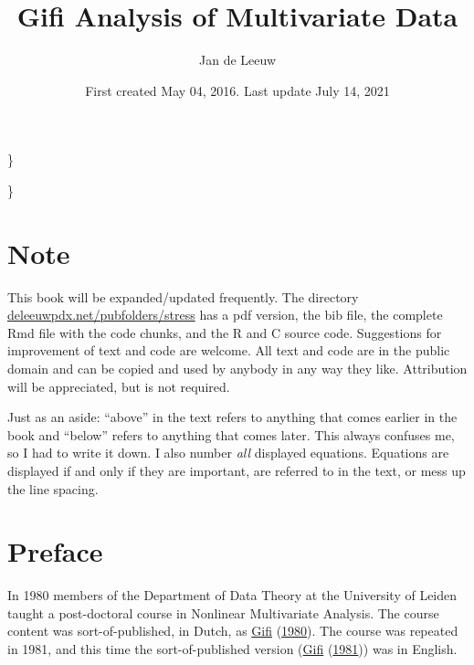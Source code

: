\documentclass[
  12pt,
]{book}
\title{Gifi Analysis of Multivariate Data}
\author{Jan de Leeuw}
\date{First created May 04, 2016. Last update July 14, 2021}
\begin{document}
\maketitle

{
\setcounter{tocdepth}{3}
\tableofcontents
}
\newcommand{\ul}[1]{\underline{#1}}
\newcommand{\ol}[1]{\overline{#1}}
\newcommand{\bb}[1]{\mathbb{#1}}
\newcommand{\mc}[1]{\mathcal{#1}}
\newcommand{\df}{=:}
\newcommand{\am}[1]{\mathop{\text{argmin}}_{#1}}

\}

\newcommand{\ls}[2]{\mathop{\sum\sum}_{#1}^{#2}}

\}
\newcommand{\ijs}{\mathop{\sum\sum}_{1\leq i<j\leq n}}
\newcommand{\jis}{\mathop{\sum\sum}_{1\leq j<i\leq n}}
\newcommand{\sij}{\sum_{i=1}^n\sum_{j=1}^n}

\newcommand{\argmin}[1]{\mathop{\mathbf{argmin}}\limits_{#1}}
\newcommand{\argmax}[1]{\mathop{\mathbf{argmax}}\limits_{#1}}

\hypertarget{note}{%
\chapter*{Note}\label{note}}

This book will be expanded/updated frequently. The directory \href{http://deleeuwpdx.net/pubfolders/stress}{deleeuwpdx.net/pubfolders/stress} has a pdf version, the bib file, the complete Rmd file with the code chunks, and the R and C source code. Suggestions for improvement of text and code are welcome. All text and code are in the public domain and can be copied and used by anybody in any way they like. Attribution will be appreciated, but is not required.

Just as an aside: ``above'' in the text refers to anything that comes earlier in the book and ``below'' refers to anything that comes later. This always confuses me, so I had to write it down. I also number \emph{all} displayed equations. Equations are displayed if and only if they are important, are referred to in the text, or mess up the line spacing.

\hypertarget{preface}{%
\chapter*{Preface}\label{preface}}

In 1980 members of the Department of Data Theory at the University of Leiden taught a post-doctoral course in Nonlinear Multivariate Analysis. The course content was sort-of-published, in Dutch, as \protect\hyperlink{ref-gifi_B_80}{Gifi} (\protect\hyperlink{ref-gifi_B_80}{1980}). The course was repeated in 1981, and this time the sort-of-published version (\protect\hyperlink{ref-gifi_B_81}{Gifi} (\protect\hyperlink{ref-gifi_B_81}{1981})) was in English.
\end{document}
